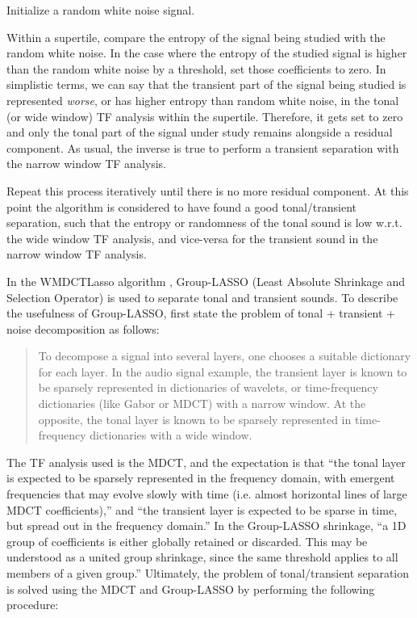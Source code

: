 \documentclass[letter,12pt]{article}
\newenvironment{tight_enumerate}{
\begin{enumerate}
  \setlength{\itemsep}{0pt}
  \setlength{\parskip}{0pt}
}{\end{enumerate}}
\begin{document}
\begin{tight_enumerate}
	\item
		Initialize a random white noise signal.
	\item
		Within a supertile, compare the entropy of the signal being studied with the random white noise. In the case where the entropy of the studied signal is higher than the random white noise by a threshold, set those coefficients to zero. In simplistic terms, we can say that the transient part of the signal being studied is represented \textit{worse}, or has higher entropy than random white noise, in the tonal (or wide window) TF analysis within the supertile. Therefore, it gets set to zero and only the tonal part of the signal under study remains alongside a residual component. As usual, the inverse is true to perform a transient separation with the narrow window TF analysis.
	\item
		Repeat this process iteratively until there is no more residual component. At this point the algorithm is considered to have found a good tonal/transient separation, such that the entropy or randomness of the tonal sound is low w.r.t. the wide window TF analysis, and vice-versa for the transient sound in the narrow window TF analysis.
\end{tight_enumerate}

In the WMDCTLasso algorithm \cite{wmdct}, Group-LASSO (Least Absolute Shrinkage and Selection Operator) is used to separate tonal and transient sounds. To describe the usefulness of Group-LASSO, \citet{sparsitykowalski} first state the problem of tonal + transient + noise decomposition as follows:

\begin{quote}
To decompose a signal into several layers, one chooses a suitable dictionary for each layer. In the audio signal example, the transient layer is known to be sparsely represented in dictionaries of wavelets, or time-frequency dictionaries (like Gabor or MDCT) with a narrow window. At the opposite, the tonal layer is known to be sparsely represented in time-frequency dictionaries with a wide window.
\end{quote}

The TF analysis used is the MDCT, and the expectation is that ``the  tonal  layer  is  expected  to  be  sparsely  represented in the frequency domain, with emergent frequencies that may evolve slowly with time (i.e. almost horizontal lines of large MDCT coefficients),'' and ``the transient layer is expected to be sparse in time, but spread out in the frequency domain.'' In the Group-LASSO shrinkage, ``a 1D group of coefficients is either globally retained or discarded. This may be understood as a united group shrinkage, since the same threshold applies to all members of a given group.'' Ultimately, the problem of tonal/transient separation is solved using the MDCT and Group-LASSO by performing the following procedure:
\end{document}
